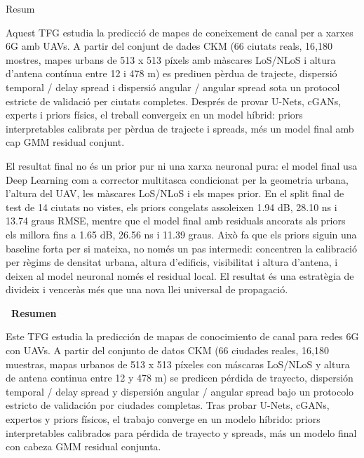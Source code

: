 {}

\begin{center}
  \huge\bfseries\raggedright Resum~\hrulefill
\end{center}
Aquest TFG estudia la predicció de mapes de coneixement de canal per a xarxes
6G amb UAVs. A partir del conjunt de dades CKM (66 ciutats reals, 16{,}180
mostres, mapes urbans de 513 x 513 píxels amb màscares LoS/NLoS i altura
d'antena contínua entre 12 i 478 m) es prediuen pèrdua de trajecte, dispersió
temporal / delay spread i dispersió angular / angular spread sota un protocol
estricte de validació per ciutats completes. Després de provar U-Nets, cGANs,
experts i priors físics, el treball convergeix en un model híbrid: priors
interpretables calibrats per pèrdua de trajecte i spreads, més un model final
amb cap GMM residual conjunt.

El resultat final no és un prior pur ni una xarxa neuronal pura: el model final
usa Deep Learning com a corrector multitasca condicionat per la geometria
urbana, l'altura del UAV, les màscares LoS/NLoS i els mapes prior. En el split
final de test de 14 ciutats no vistes, els priors congelats assoleixen
1.94 dB, 28.10 ns i 13.74 graus RMSE, mentre que el model final amb residuals
ancorats als priors els millora fins a 1.65 dB, 26.56 ns i 11.39 graus. Això
fa que els priors siguin una baseline forta per si mateixa, no només un pas
intermedi: concentren la calibració per règims de densitat urbana, altura
d'edificis, visibilitat i altura d'antena, i deixen al model neuronal només el
residual local. El resultat és una estratègia de divideix i venceràs més que una
nova llei universal de propagació.

\begin{center}
  \huge\bfseries\raggedleft\vspace*{.5\baselineskip} \hrulefill ~Resumen
\end{center}
Este TFG estudia la predicción de mapas de conocimiento de canal para redes 6G
con UAVs. A partir del conjunto de datos CKM (66 ciudades reales, 16{,}180
muestras, mapas urbanos de 513 x 513 píxeles con máscaras LoS/NLoS y altura de
antena continua entre 12 y 478 m) se predicen pérdida de trayecto, dispersión
temporal / delay spread y dispersión angular / angular spread bajo un protocolo
estricto de validación por ciudades completas. Tras probar U-Nets, cGANs,
expertos y priors físicos, el trabajo converge en un modelo híbrido: priors
interpretables calibrados para pérdida de trayecto y spreads, más un modelo
final con cabeza GMM residual conjunta.

